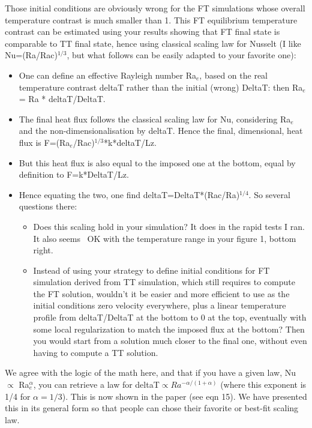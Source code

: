 \documentclass[aps, 11pt, singlecolumn]{revtex4-1} %
\begin{document}
\begin{singlespace}
\begin{myquotation}
Those initial conditions are obviously wrong for the FT simulations whose overall temperature contrast is much smaller than 1. 
This FT equilibrium temperature contrast can be estimated using your results showing that FT final state is comparable to TT final state, hence using classical scaling law for Nusselt (I like Nu=(Ra/Rac)$^{1/3}$, but what follows can be easily adapted to your favorite one):
\begin{itemize}
\item One can define an effective Rayleigh number Ra$_e$, based on the real temperature contrast deltaT rather than the initial (wrong) DeltaT: then Ra$_e$ = Ra * deltaT/DeltaT.
\item The final heat flux follows the classical scaling law for Nu, considering Ra$_e$ and the non-dimensionalisation by deltaT. 
Hence the final, dimensional, heat flux is F=(Ra$_e$/Rac)$^{1/3}$*k*deltaT/Lz.
\item But this heat flux is also equal to the imposed one at the bottom, equal by definition to F=k*DeltaT/Lz.
\item Hence equating the two, one find deltaT=DeltaT*(Rac/Ra)$^{1/4}$. So several questions there: 
\begin{itemize}
	\item Does this scaling hold in your simulation? It does in the rapid tests I ran. It also seems ~OK with the temperature range in your figure 1, bottom right.
	\item Instead of using your strategy to define initial conditions for FT simulation derived from TT simulation, which still requires to compute the FT solution, wouldn’t it be easier and more efficient to use as the initial conditions zero velocity everywhere, plus a linear temperature profile from deltaT/DeltaT at the bottom to 0 at the top, eventually with some local regularization to match the imposed flux at the bottom? 
	Then you would start from a solution much closer to the final one, without even having to compute a TT solution.
\end{itemize}
\end{itemize}
\end{myquotation}
We agree with the logic of the math here, and that if you have a given law, Nu $\propto$ Ra$_e^{\alpha}$, you can retrieve a law for deltaT$\propto Ra^{-\alpha/(1+\alpha)}$ (where this exponent is 1/4 for $\alpha = 1/3$).
This is now shown in the paper (see eqn 15).
We have presented this in its general form so that people can chose their favorite or best-fit scaling law.

\end{singlespace}
\end{document}
